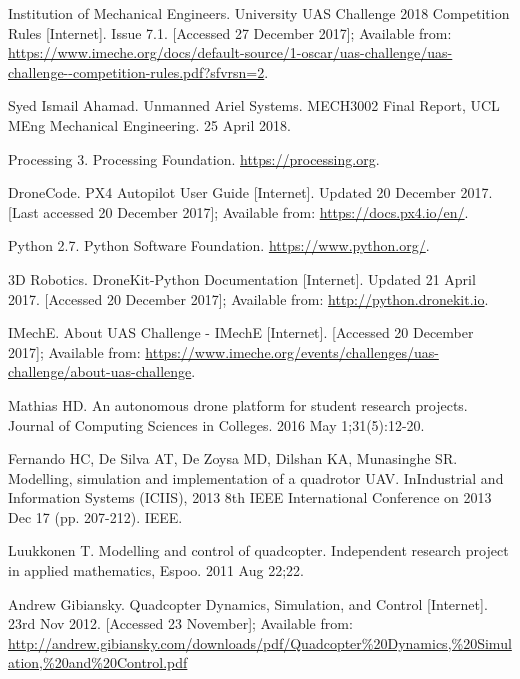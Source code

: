 \documentclass[11pt]{article}
\begin{document}
\newpage
\small
\begin{thebibliography}{11}

    Institution of Mechanical Engineers. University UAS Challenge 2018 Competition Rules [Internet]. Issue 7.1. [Accessed 27 December 2017]; Available from: \url{https://www.imeche.org/docs/default-source/1-oscar/uas-challenge/uas-challenge--competition-rules.pdf?sfvrsn=2}.

    Syed Ismail Ahamad. Unmanned Ariel Systems. MECH3002 Final Report, UCL MEng Mechanical Engineering. 25 April 2018.

    Processing 3. Processing Foundation. \url{https://processing.org}.

    DroneCode. PX4 Autopilot User Guide [Internet]. Updated 20 December 2017. [Last accessed 20 December 2017]; Available from: \url{https://docs.px4.io/en/}.

    Python 2.7. Python Software Foundation. \url{https://www.python.org/}.

    3D Robotics. DroneKit-Python Documentation [Internet]. Updated 21 April 2017. [Accessed 20 December 2017]; Available from: \url{http://python.dronekit.io}.

    IMechE. About UAS Challenge - IMechE [Internet]. [Accessed 20 December 2017]; Available from: \url{https://www.imeche.org/events/challenges/uas-challenge/about-uas-challenge}.

    Mathias HD. An autonomous drone platform for student research projects. Journal of Computing Sciences in Colleges. 2016 May 1;31(5):12-20.

    Fernando HC, De Silva AT, De Zoysa MD, Dilshan KA, Munasinghe SR. Modelling, simulation and implementation of a quadrotor UAV. InIndustrial and Information Systems (ICIIS), 2013 8th IEEE International Conference on 2013 Dec 17 (pp. 207-212). IEEE.

    Luukkonen T. Modelling and control of quadcopter. Independent research project in applied mathematics, Espoo. 2011 Aug 22;22.

    Andrew Gibiansky. Quadcopter Dynamics, Simulation, and Control [Internet]. 23rd Nov 2012. [Accessed 23 November]; Available from: \url{http://andrew.gibiansky.com/downloads/pdf/Quadcopter%20Dynamics,%20Simulation,%20and%20Control.pdf}


\end{thebibliography}
\end{document}

